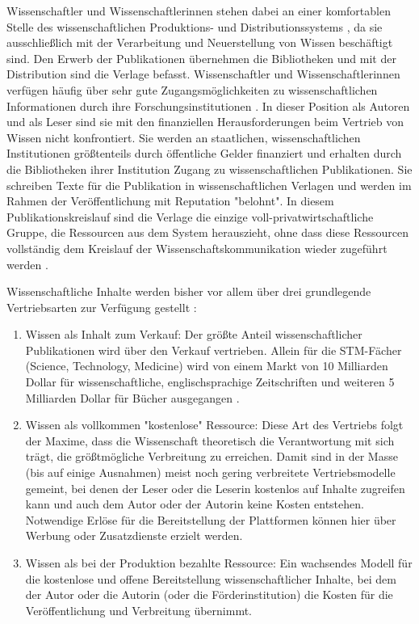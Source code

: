 Wissenschaftler und Wissenschaftlerinnen stehen dabei an einer komfortablen Stelle des wissenschaftlichen Produktions- und Distributionssystems \cite{herb_2010}, da sie ausschließlich mit der Verarbeitung und Neuerstellung von Wissen beschäftigt sind. Den Erwerb der Publikationen übernehmen die Bibliotheken und mit der Distribution sind die Verlage befasst. Wissenschaftler und Wissenschaftlerinnen verfügen häufig über sehr gute Zugangsmöglichkeiten zu wissenschaftlichen Informationen durch ihre Forschungsinstitutionen \cite{cope2014future}. In dieser Position als Autoren und als Leser sind sie mit den finanziellen Herausforderungen beim Vertrieb von Wissen nicht konfrontiert. Sie werden an staatlichen, wissenschaftlichen Institutionen größtenteils durch öffentliche Gelder finanziert und erhalten durch die Bibliotheken ihrer Institution Zugang zu wissenschaftlichen Publikationen. Sie schreiben Texte für die Publikation in wissenschaftlichen Verlagen und werden im Rahmen der Veröffentlichung mit Reputation "belohnt". In diesem Publikationskreislauf sind die Verlage die einzige voll-privatwirtschaftliche Gruppe, die Ressourcen aus dem System herauszieht, ohne dass diese Ressourcen vollständig dem Kreislauf der Wissenschaftskommunikation wieder zugeführt werden \cite{kiley_2006_open}.

Wissenschaftliche Inhalte werden bisher vor allem über drei grundlegende Vertriebsarten zur Verfügung gestellt \cite{cope2014future}:
\begin{enumerate}
\item Wissen als Inhalt zum Verkauf: Der größte Anteil wissenschaftlicher Publikationen wird über den Verkauf vertrieben. Allein für die STM-Fächer (Science, Technology, Medicine) wird von einem Markt von 10 Milliarden Dollar für wissenschaftliche, englischsprachige Zeitschriften und weiteren 5 Milliarden Dollar für Bücher ausgegangen \cite[:6]{ware_2015_stm}.
\item Wissen als vollkommen "kostenlose" Ressource: Diese Art des Vertriebs folgt der Maxime, dass die Wissenschaft theoretisch die Verantwortung mit sich trägt, die größtmögliche Verbreitung zu erreichen. Damit sind in der Masse (bis auf einige Ausnahmen) meist noch gering verbreitete Vertriebsmodelle gemeint, bei denen der Leser oder die Leserin kostenlos auf Inhalte zugreifen kann und auch dem Autor oder der Autorin keine Kosten entstehen. Notwendige Erlöse für die Bereitstellung der Plattformen können hier über Werbung oder Zusatzdienste erzielt werden.
\item Wissen als bei der Produktion bezahlte Ressource: Ein wachsendes Modell für die kostenlose und offene Bereitstellung wissenschaftlicher Inhalte, bei dem der Autor oder die Autorin (oder die Förderinstitution) die Kosten für die Veröffentlichung und Verbreitung übernimmt.
\end{enumerate}

